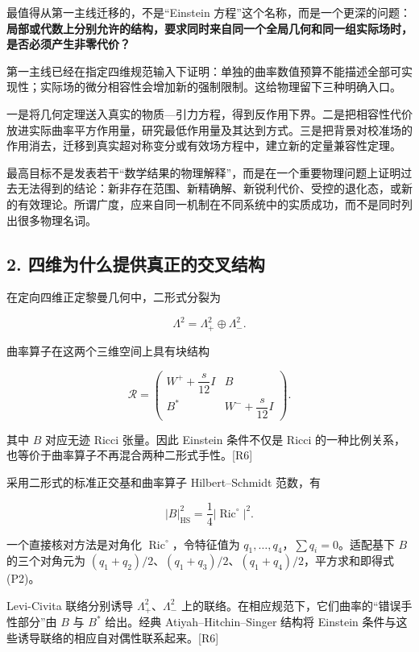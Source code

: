 \documentclass[UTF8,a4paper,11pt,fontset=fandol]{ctexart}
\begin{document}
最值得从第一主线迁移的，不是``Einstein
方程''这个名称，而是一个更深的问题：\textbf{局部或代数上分别允许的结构，要求同时来自同一个全局几何和同一组实际场时，是否必须产生非零代价？}

第一主线已经在指定四维规范输入下证明：单独的曲率数值预算不能描述全部可实现性；实际场的微分相容性会增加新的强制限制。这给物理留下三种明确入口。

一是将几何定理送入真实的物质---引力方程，得到反作用下界。二是把相容性代价放进实际曲率平方作用量，研究最低作用量及其达到方式。三是把背景对校准场的作用消去，迁移到真实超对称变分或有效场方程中，建立新的定量兼容性定理。

最高目标不是发表若干``数学结果的物理解释''，而是在一个重要物理问题上证明过去无法得到的结论：新非存在范围、新精确解、新锐利代价、受控的退化态，或新的有效理论。所谓广度，应来自同一机制在不同系统中的实质成功，而不是同时列出很多物理名词。

\subsection{2.
四维为什么提供真正的交叉结构}\label{ux56dbux7ef4ux4e3aux4ec0ux4e48ux63d0ux4f9bux771fux6b63ux7684ux4ea4ux53c9ux7ed3ux6784}

在定向四维正定黎曼几何中，二形式分裂为

\[
\Lambda^2=\Lambda^2_+\oplus\Lambda^2_-.
\]

曲率算子在这两个三维空间上具有块结构

\[
\mathcal R=
\begin{pmatrix}
W^++\dfrac{s}{12}I&B\\
B^*&W^-+\dfrac{s}{12}I
\end{pmatrix}.
\tag{P1}
\]

其中 \(B\) 对应无迹 Ricci 张量。因此 Einstein 条件不仅是 Ricci
的一种比例关系，也等价于曲率算子不再混合两种二形式手性。{[}R6{]}

采用二形式的标准正交基和曲率算子 Hilbert--Schmidt 范数，有

\[
\boxed{|B|_{\mathrm{HS}}^2=\frac14|\operatorname{Ric}^{\circ}|^2.}
\tag{P2}
\]

一个直接核对方法是对角化 \(\operatorname{Ric}^{\circ}\)，令特征值为
\(q_1,\ldots,q_4\)，\(\sum q_i=0\)。适配基下 \(B\) 的三个对角元为
\((q_1+q_2)/2\)、\((q_1+q_3)/2\)、\((q_1+q_4)/2\)，平方求和即得式(P2)。

Levi-Civita 联络分别诱导 \(\Lambda^2_+\)、\(\Lambda^2_-\)
上的联络。在相应规范下，它们曲率的``错误手性部分''由 \(B\) 与 \(B^*\)
给出。经典 Atiyah--Hitchin--Singer 结构将 Einstein
条件与这些诱导联络的相应自对偶性联系起来。{[}R6{]}
\end{document}
